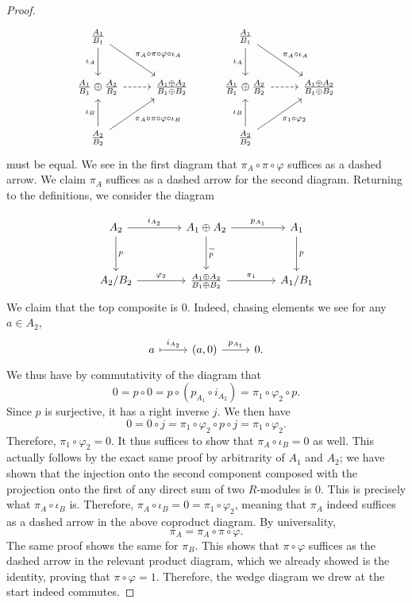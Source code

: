 \documentclass[11pt, letterpaper]{article}
\begin{document}
\begin{proof}
\[\begin{tikzcd}[row sep = 2.5em, column sep = 2.5em]
\frac{A_1}{B_1} \ar[" \pi _A \circ \pi \circ \varphi \circ \iota _A ", dr] \ar[" \iota _A "', d]  &  & \frac{A_1}{B_1} \ar[" \pi _A\circ \iota _A ", dr] \ar[" \iota _A "', d]  &  \\
\frac{A_1}{B_1} \oplus \frac{A_2}{B_2} \ar[dashed, r]  & \frac{A_1\oplus A_2}{B_1\oplus B_2}  & \frac{A_1}{B_1} \oplus \frac{A_2}{B_2} \ar[dashed, r]  & \frac{A_1\oplus A_2}{B_1\oplus B_2}  \\
\frac{A_2}{B_2} \ar[" \iota _B ", u] \ar[" \pi _A\circ \pi \circ \varphi \circ \iota _B "', ur]  &  & \frac{A_2}{B_2} \ar[" \iota _B ", u] \ar[" \pi _1 \circ \varphi _2 "', ur]  & 
\end{tikzcd}\]
must be equal. We see in the first diagram that $\pi _A \circ \pi \circ \varphi $ suffices as a dashed arrow. We claim $\pi _A$ suffices as a dashed arrow for the second diagram. Returning to the definitions, we consider the diagram

\[\begin{tikzcd}[row sep = 3em, column sep = 4em] A_2 \ar["i_{A_2}", r] \ar["p", d] & A_1 \oplus A_2 \ar["\widetilde{p}", d] \ar["p_{A_1}", r] & A_1 \ar["p", d] \\ A_2/B_2 \ar["\varphi_2", r] & \frac{A_1 \oplus A_2}{B_1 \oplus B_2} \ar["\pi_1", r] & A_1/B_1 \end{tikzcd}\]
We claim that the top composite is 0. Indeed, chasing elements we see for any $a\in A_2$,
\[\begin{tikzcd}[row sep = 2.5em, column sep = 2.5em]
	a \ar[" i_{A_2}  ", mapsto,r]  & (a,0) \ar[" p_{A_1}  ", r] & 0.
\end{tikzcd}\]
We thus have by commutativity of the diagram that
\[
	0 = p \circ  0 = p \circ (p_{A_1} \circ i_{A_2} ) = \pi _1 \circ \varphi _2 \circ p
.\]
Since $p$ is surjective, it has a right inverse $j$. We then have
\[
	0 = 0 \circ j = \pi _1 \circ \varphi _2 \circ p \circ j = \pi _1 \circ \varphi _2
.\]
Therefore, $\pi _1 \circ \varphi _2 = 0$. It thus suffices to show that $\pi _A \circ \iota _B = 0$ as well. This actually follows by the exact same proof by arbitrarity of $A_1$ and $A_2$; we have shown that the injection onto the second component composed with the projection onto the first of any direct sum of two $R$-modules is 0. This is precisely what $\pi _A \circ \iota _B$ is. Therefore, $\pi _A \circ \iota _B = 0 = \pi _1 \circ \varphi _2$, meaning that $\pi _A$ indeed suffices as a dashed arrow in the above coproduct diagram. By universality,
\[
	\pi _A = \pi _A \circ \pi \circ \varphi 
.\]
The same proof shows the same for $\pi _B$. This shows that $\pi \circ \varphi $ suffices as the dashed arrow in the relevant product diagram, which we already showed is the identity, proving that $\pi \circ \varphi =1$. Therefore, the wedge diagram we drew at the start indeed commutes.



\end{proof}
\end{document}
